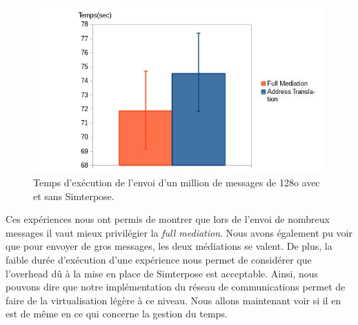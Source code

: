 \begin{figure}
  \centering
    \includegraphics[scale=0.5]{mesures/graph/Littlemsg.jpg}
    \caption{Temps d'exécution de l'envoi d'un million de messages de 128o avec et sans Simterpose.}
    \label{Network_Little_Mediation}
\end{figure}

Ces expériences nous ont permis de montrer que lors de l'envoi de nombreux messages il vaut mieux privilégier la \textit{full mediation}. Nous avons également pu voir que pour envoyer de gros messages, les deux médiations se valent. De plus, la faible durée d'exécution d'une expérience nous permet de considérer que l'overhead dû à la mise en place de Simterpose est acceptable. Ainsi, nous pouvons dire que notre implémentation du réseau de communications permet de faire de la virtualisation légère à ce niveau. Nous allons maintenant voir si il en est de même en ce qui concerne la gestion du temps.
